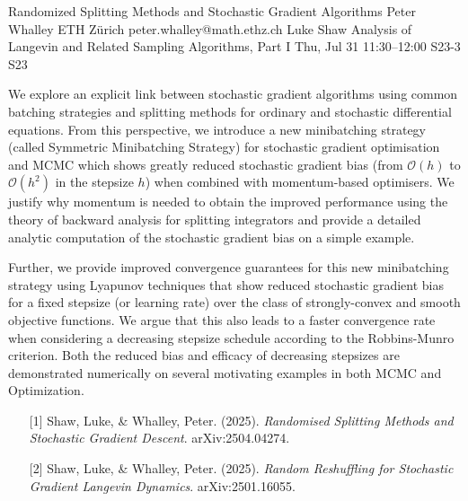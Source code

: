 \begin{talk}
  {Randomized Splitting Methods and Stochastic Gradient Algorithms}%
  {Peter Whalley}%
  {ETH Z\"{u}rich}%
  {peter.whalley@math.ethz.ch}%
  {Luke Shaw}%
  {Analysis of Langevin and Related Sampling Algorithms, Part I}%
  {Thu, Jul 31 11:30–12:00}%
  {S23-3}%
  {S23}%
				
			
We explore an explicit link between stochastic gradient algorithms using common batching strategies and splitting methods for ordinary and stochastic differential equations. From this perspective, we introduce a new minibatching strategy (called Symmetric Minibatching Strategy) for stochastic gradient optimisation and MCMC which shows greatly reduced stochastic gradient bias (from $\mathcal{O}(h)$ to $\mathcal{O}(h^{2})$ in the stepsize $h$) when combined with momentum-based optimisers. We justify why momentum is needed to obtain the improved performance using the theory of backward analysis for splitting integrators and provide a detailed analytic computation of the stochastic gradient bias on a simple example.

 

Further, we provide improved convergence guarantees for this new minibatching strategy using Lyapunov techniques that show reduced stochastic gradient bias for a fixed stepsize (or learning rate) over the class of strongly-convex and smooth objective functions. We argue that this also leads to a faster convergence rate when considering a decreasing stepsize schedule according to the Robbins-Munro criterion. Both the reduced bias and efficacy of decreasing stepsizes are demonstrated numerically on several motivating examples in both MCMC and Optimization.

\medskip

\begin{enumerate}
	\item[{[1]}] Shaw, Luke, \& Whalley, Peter. (2025). {\it Randomised Splitting Methods and Stochastic Gradient Descent}. arXiv:2504.04274.
	\item[{[2]}] Shaw, Luke, \& Whalley, Peter. (2025). {\it Random Reshuffling for Stochastic Gradient Langevin Dynamics}. arXiv:2501.16055.
\end{enumerate}

\end{talk}

